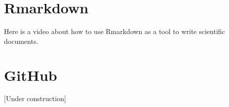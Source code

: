 \documentclass[
]{book}
\newlength{\cslhangindent}
\newlength{\cslentryspacingunit} %
\newenvironment{CSLReferences}[2] %
 {%
  \setlength{\parindent}{0pt}
  \ifodd #1
  \let\oldpar\par
  \def\par{\hangindent=\cslhangindent\oldpar}
  \fi
  \setlength{\parskip}{#2\cslentryspacingunit}
 }%
 {}
\begin{document}
\hypertarget{rmarkdown}{%
\section{Rmarkdown}\label{rmarkdown}}

Here is a video about how to use Rmarkdown as a tool to write scientific documents.

\hypertarget{github}{%
\section{GitHub}\label{github}}

{[}Under construction{]}

\hypertarget{refs}{}
\begin{CSLReferences}{0}{0}
\end{CSLReferences}

  
\end{document}
